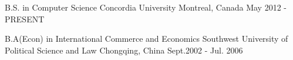 \documentclass[11pt, a4paper]{awesome-cv} %
\begin{document}
\makecvheader %





\begin{cventries}
	
	
	\cventry
	{B.S. in Computer Science} %
	{Concordia University} %
	{Montreal, Canada} %
	{May 2012 - PRESENT} %
	{ %
	}
	
	
	
\end{cventries}

\begin{cventries}
	
	
	\cventry
	{B.A(Econ) in International Commerce and Economics} %
	{Southwest University of Political Science and Law} %
	{Chongqing, China} %
	{Sept.2002 - Jul. 2006 } %
	{
	}
	
	
\end{cventries}




\end{document}
